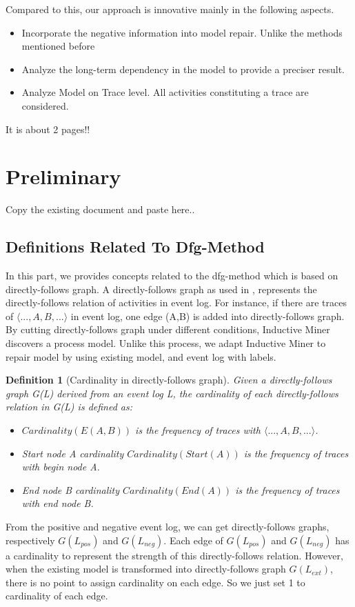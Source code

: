 \documentclass[]{article}
\newtheorem{mydef}{Definition}[section]
\begin{document}
Compared to this, our approach is innovative mainly in the following aspects. 
\begin{itemize}
	\item Incorporate the negative information into model repair. Unlike the methods mentioned before
	\item Analyze the long-term dependency in the model to provide a preciser result. 
	\item Analyze Model on Trace level. All activities constituting a trace are considered. 
\end{itemize}

It is about 2 pages!!

\section{Preliminary}
Copy the existing document and paste here.. 
\subsection{Definitions Related To Dfg-Method}
In this part, we provides concepts related to the dfg-method which is based on directly-follows graph. A directly-follows graph as used in \cite{leemans2013discovering}, represents the directly-follows relation of activities in event log. For instance, if there are traces of $\langle ...,A,B,... \rangle$ in event log, one edge (A,B) is added into directly-follows graph. By cutting directly-follows graph under different conditions, Inductive Miner\cite{leemans2013discovering,leemans2014discovering} discovers a process model. Unlike this process, we adapt Inductive Miner to repair model by using existing model, and event log with labels.

\begin{mydef}[Cardinality in directly-follows graph]
	Given a directly-follows graph G(L) derived from an event log L, the cardinality of each directly-follows relation in G(L) is defined as:  
	\begin{itemize}
		\item $Cardinality(E(A,B))$ is the frequency of traces with $\langle ...,A,B,... \rangle$. 
		\item Start node A cardinality $Cardinality(Start(A))$ is the frequency of traces with begin node A.
		\item End node B cardinality $Cardinality(End(A))$ is the frequency of traces with end node B.
	\end{itemize}	
\end{mydef}
From the positive and negative event log, we can get directly-follows graphs, respectively $G(L_{pos})$ and $G(L_{neg})$. Each edge of  $G(L_{pos})$ and $G(L_{neg})$ has a cardinality to represent the strength of this directly-follows relation. 
However, when the existing model is transformed into  directly-follows graph $G(L_{ext})$, there is no point to assign cardinality on each edge. So we just set 1 to cardinality of each edge. 
\end{document}
